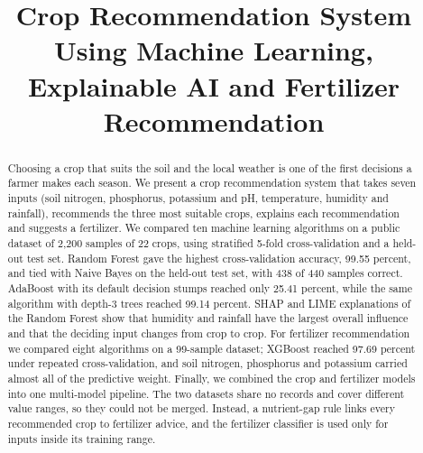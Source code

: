 \documentclass[conference]{IEEEtran}
\begin{document}
\title{Crop Recommendation System Using Machine Learning, Explainable AI and Fertilizer Recommendation}

\author{
\and
{}
\and
{}
}

\maketitle

\begin{abstract}
Choosing a crop that suits the soil and the local weather is one of the first decisions a farmer makes each season. We present a crop recommendation system that takes seven inputs (soil nitrogen, phosphorus, potassium and pH, temperature, humidity and rainfall), recommends the three most suitable crops, explains each recommendation and suggests a fertilizer. We compared ten machine learning algorithms on a public dataset of 2,200 samples of 22 crops, using stratified 5-fold cross-validation and a held-out test set. Random Forest gave the highest cross-validation accuracy, 99.55 percent, and tied with Naive Bayes on the held-out test set, with 438 of 440 samples correct. AdaBoost with its default decision stumps reached only 25.41 percent, while the same algorithm with depth-3 trees reached 99.14 percent. SHAP and LIME explanations of the Random Forest show that humidity and rainfall have the largest overall influence and that the deciding input changes from crop to crop. For fertilizer recommendation we compared eight algorithms on a 99-sample dataset; XGBoost reached 97.69 percent under repeated cross-validation, and soil nitrogen, phosphorus and potassium carried almost all of the predictive weight. Finally, we combined the crop and fertilizer models into one multi-model pipeline. The two datasets share no records and cover different value ranges, so they could not be merged. Instead, a nutrient-gap rule links every recommended crop to fertilizer advice, and the fertilizer classifier is used only for inputs inside its training range.
\end{abstract}
\end{document}
